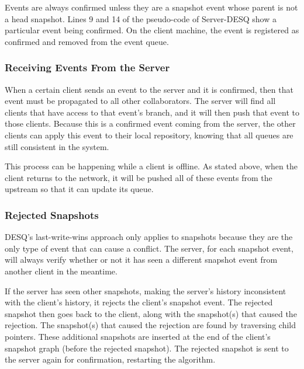 Events are always confirmed unless they are a snapshot event whose parent is not a head snapshot. Lines 9 and 14 of the pseudo-code of Server-DESQ show a particular event being confirmed. On the client machine, the event is registered as confirmed and removed from the event queue.

\subsubsection{Receiving Events From the Server}

When a certain client sends an event to the server and it is confirmed, then that event must be propagated to all other collaborators. The server will find all clients that have access to that event's branch, and it will then push that event to those clients. Because this is a confirmed event coming from the server, the other clients can apply this event to their local repository, knowing that all queues are still consistent in the system.

This process can be happening while a client is offline. As stated above, when the client returns to the network, it will be pushed all of these events from the upstream so that it can update its queue. 

\subsubsection{Rejected Snapshots}

DESQ's last-write-wins approach only applies to snapshots because they are the only type of event that can cause a conflict. The server, for each snapshot event, will always verify whether or not it has seen a different snapshot event from another client in the meantime.

If the server has seen other snapshots, making the server's history inconsistent with the client's history, it rejects the client's snapshot event. The rejected snapshot then goes back to the client, along with the snapshot(s) that caused the rejection. The snapshot(s) that caused the rejection are found by traversing child pointers. These additional snapshots are inserted at the end of the client's snapshot graph (before the rejected snapshot). The rejected snapshot is sent to the server again for confirmation, restarting the algorithm. 

